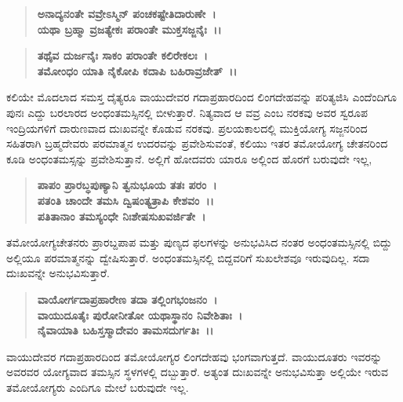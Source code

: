 \begin{verse}
\textbf{ಅನಾದ್ಯನಂತೇ ವವ್ರೇಽಸ್ಮಿನ್ ಪಂಚಕಷ್ಟೇತಿದಾರುಣೇ~।}\\\textbf{ಯಥಾ ಬ್ರಹ್ಮಾ ವ್ರಜತ್ಯೇಕಃ ಪರಾಂತೇ ಮುಕ್ತಸಜ್ಜನೈಃ~।।}
\end{verse}

\vskip -4pt

\begin{verse}
\textbf{ತಥೈವ ದುರ್ಜನೈಃ ಸಾಕಂ ಪರಾಂತೇ ಕಲಿರೇಕಲಃ~।}\\\textbf{ತಮೋಂಧಂ ಯಾತಿ ನೈಕೋಪಿ ಕದಾಪಿ ಬಹಿರಾವ್ರಜೇತ್~।।}
\end{verse}

\vskip -4pt


\vskip 2pt

ಕಲಿಯೇ ಮೊದಲಾದ ಸಮಸ್ತ ದೈತ್ಯರೂ ವಾಯುದೇವರ ಗದಾಪ್ರಹಾರದಿಂದ ಲಿಂಗದೇಹವನ್ನು ಪರಿತ್ಯಜಿಸಿ ಎಂದೆಂದಿಗೂ ಪುನಃ ಎದ್ದು ಬರಲಾರದ ಅಂಧಂತಮಸ್ಸಿನಲ್ಲಿ ಬೀಳುತ್ತಾರೆ. ನಿತ್ಯವಾದ ಆ ವವ್ರ ಎಂಬ ನರಕವು ಅವರ ಸ್ವರೂಪ ಇಂದ್ರಿಯಗಳಿಗೆ ದಾರುಣವಾದ ದುಃಖವನ್ನೇ ಕೊಡುವ ನರಕವು. ಪ್ರಲಯಕಾಲದಲ್ಲಿ ಮುಕ್ತಿಯೋಗ್ಯ ಸಜ್ಜನರಿಂದ ಸಹಿತರಾಗಿ ಬ್ರಹ್ಮದೇವರು ಪರಮಾತ್ಮನ ಉದರವನ್ನು ಪ್ರವೇಶಿಸುವಂತೆ, ಕಲಿಯು ಇತರ ತಮೋಯೋಗ್ಯ ಚೇತನರಿಂದ ಕೂಡಿ ಅಂಧಂತಮಸ್ಸನ್ನು ಪ್ರವೇಶಿಸುತ್ತಾನೆ. ಅಲ್ಲಿಗೆ ಹೋದವರು ಯಾರೂ ಅಲ್ಲಿಂದ ಹೊರಗೆ ಬರುವುದೇ ಇಲ್ಲ,

\begin{verse}
\textbf{ಪಾಪಂ ಪ್ರಾರಬ್ಧಪುಣ್ಯಾನಿ ತ್ವನುಭೂಯ ತತಃ ಪರಂ~।}\\\textbf{ಪತಂತಿ ಚಾಂದೇ ತಮಸಿ ದ್ವಿಷಂತ್ಯತ್ರಾಪಿ ಕೇಶವಂ~।।}\\\textbf{ಪತಿತಾನಾಂ ತಮಸ್ಯಂಧೇ ನಿಃಶೇಷಸುಖವರ್ಜಿತೇ~।}
\end{verse}

\vskip -4pt


\vskip 2pt

ತಮೋಯೋಗ್ಯಚೇತನರು ಪ್ರಾರಬ್ದಪಾಪ ಮತ್ತು ಪುಣ್ಯದ ಫಲಗಳನ್ನು ಅನುಭವಿಸಿದ ನಂತರ ಅಂಧಂತಮಸ್ಸಿನಲ್ಲಿ ಬಿದ್ದು ಅಲ್ಲಿಯೂ ಪರಮಾತ್ಮನನ್ನು ದ್ವೇಷಿಸುತ್ತಾರೆ. ಅಂಧಂತಮಸ್ಸಿನಲ್ಲಿ ಬಿದ್ದವರಿಗೆ ಸುಖಲೇಶವೂ ಇರುವುದಿಲ್ಲ. ಸದಾ ದುಃಖವನ್ನೇ ಅನುಭವಿಸುತ್ತಾರೆ.

\begin{verse}
\textbf{ವಾಯೋರ್ಗದಾಪ್ರಹಾರೇಣ ತದಾ ತಲ್ಲಿಂಗಭಂಜನಂ~।}\\\textbf{ವಾಯುದೂತೈಃ ಪುರೋನೀತೋ ಯಥಾಸ್ಥಾನಂ ನಿವೇಶಿತಾಃ~।}\\\textbf{ನೈವಾಯಾತಿ ಬಹಿಸ್ತಸ್ಮಾದೇವಂ ತಾಮಸದುರ್ಗತಿಃ~।।}
\end{verse}

\vskip -3pt


\newpage

ವಾಯುದೇವರ ಗದಾಪ್ರಹಾರದಿಂದ ತಮೋಯೋಗ್ಯರ ಲಿಂಗದೇಹವು ಭಂಗವಾಗುತ್ತದೆ. ವಾಯುದೂತರು ಇವರನ್ನು ಅವರವರ ಯೋಗ್ಯವಾದ ತಮಸ್ಸಿನ ಸ್ಥಳಗಳಲ್ಲಿ ದಬ್ಬುತ್ತಾರೆ. ಅತ್ಯಂತ ದುಃಖವನ್ನೇ ಅನುಭವಿಸುತ್ತಾ ಅಲ್ಲಿಯೇ ಇರುವ ತಮೋಯೋಗ್ಯರು ಎಂದಿಗೂ ಮೇಲೆ ಬರುವುದೇ ಇಲ್ಲ.

